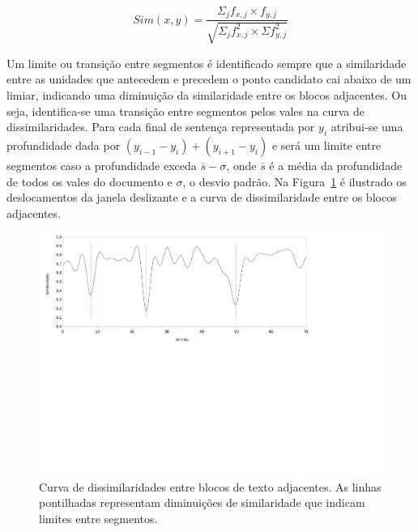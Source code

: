 \begin{equation}
	Sim(x,y) = \frac
	{\Sigma_j f_{x,j} \times f_{y,j}}
	{\sqrt{\Sigma_j f^2_{x,j} \times \Sigma f^2_{y,j}}}
	\label{equ:cosine}
\end{equation}

 
Um limite ou transição entre segmentos é identificado sempre que a similaridade entre as unidades que antecedem e precedem o ponto candidato cai abaixo de um limiar, indicando uma diminuição da similaridade entre os blocos adjacentes. Ou seja, identifica-se uma transição entre segmentos pelos vales na curva de dissimilaridades. Para cada final de sentença representada por $y_i$ atribui-se uma profundidade dada por $(y_{i-1}-y_{i}) + (y_{i+1}-y_{i})$ e será um limite entre segmentos caso a profundidade exceda $\overline{s} - \sigma$, onde $\overline{s}$ é a média da profundidade de todos os vales do documento e $\sigma$, o desvio padrão. Na Figura~\ref{fig:curvasimilaridade} é ilustrado os deslocamentos da janela deslizante e a curva de dissimilaridade entre os blocos adjacentes.  

   
\begin{figure}[h!]
\center
	\includegraphics[trim={ 10 320 180 0 },clip,page=1,width=\textwidth]{conteudo/capitulos/figs/curva-similaridade.pdf}

	\caption{Curva de dissimilaridades entre blocos de texto adjacentes. As linhas pontilhadas representam diminuições de similaridade que indicam limites entre segmentos.}
	\label{fig:curvasimilaridade}
\end{figure}






